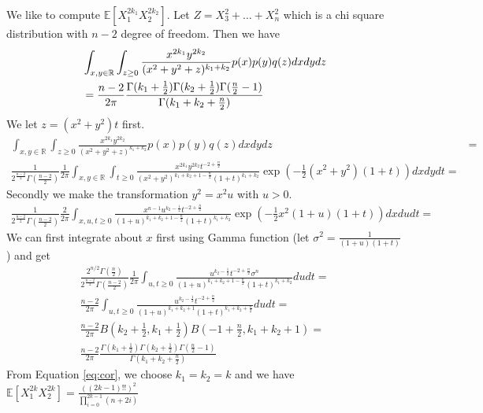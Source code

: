 \documentclass{article}
\def\E{\mathbb{E}}
\begin{document}
We like to compute $\E[X_1^{2k_1} X_2^{2k_2}]$.
Let $ Z = X_3^2 + \dots + X_n^2$ which is a chi square distribution
with $n-2$ degree of freedom.
Then we have
\begin{align}\label{eq:cor}
&\int_{x,y\in \mathbb{R}}\int_{z\geq 0}
\frac{x^{2k_1} y^{2k_2}}{(x^2+y^2+z)^{k_1 + k_2}} p(x)p(y)q(z) dxdydz \notag\\
&=\frac{n-2}{2\pi} \frac{\Gamma(k_1 + \frac{1}{2})
\Gamma(k_2 + \frac{1}{2})
\Gamma(\frac{n}{2}-1)}{\Gamma(k_1 + k_2 + \frac{n}{2})}
\end{align}
We let $z=(x^2+y^2)t$ first.
\begin{align*}
\int_{x,y\in \mathbb{R}}\int_{z\geq 0}
\frac{x^{2k_1} y^{2k_2}}{(x^2+y^2+z)^{k_1 + k_2}} p(x)p(y)q(z) dxdydz & =\\
\frac{1}{2^{\frac{n-2}{2}}\Gamma(\frac{n-2}{2})}\frac{1}{2\pi}
\int_{x,y\in \mathbb{R}}\int_{t\geq 0}
\frac{x^{2k_1} y^{2k_2}t^{-2+\frac{n}{2}}}
{(x^2+y^2)^{k_1 + k_2+1-\frac{n}{2}}(1+t)^{k_1 + k_2}}
\exp(-\frac{1}{2}(x^2+y^2)(1+t))dxdydt =
\end{align*}
Secondly we make the transformation $y^2=x^2u$ with $u>0$.
\begin{align*}
\frac{1}{2^{\frac{n-2}{2}}\Gamma(\frac{n-2}{2})}\frac{2}{2\pi}
\int_{x,u,t\geq 0}\frac{x^{n-1}
u^{k_2 - \frac{1}{2}}t^{-2+\frac{n}{2}}}
{(1+u)^{k_1 + k_2+1-\frac{n}{2}}(1+t)^{k_1 + k_2}}
\exp(-\frac{1}{2}x^2(1+u)(1+t))dxdudt =
\end{align*}
We can first integrate about $x$ first using Gamma function
(let $\sigma^2 = \frac{1}{(1+u)(1+t)}$)
and get
\begin{align*}
\frac{2^{n/2} \Gamma(\frac{n}{2})}{2^{\frac{n-2}{2}}
\Gamma(\frac{n-2}{2})}\frac{1}{2\pi}\int_{u,t\geq 0}
\frac{u^{k_2 - \frac{1}{2}}t^{-2+\frac{n}{2}}\sigma^n}
{(1+u)^{k_1 + k_2+1-\frac{n}{2}}(1+t)^{k_1 + k_2}}dudt = \\
\frac{n-2}{2\pi}\int_{u,t\geq 0}
\frac{u^{k_2 - \frac{1}{2}}t^{-2+\frac{n}{2}}}
{(1+u)^{k_1 + k_2+1}(1+t)^{k_1 + k_2 + \frac{n}{2}}}dudt = \\
\frac{n-2}{2\pi}
B(k_2 + \frac{1}{2}, k_1 + \frac{1}{2}) B(-1+\frac{n}{2}, k_1 + k_2 + 1) =\\
\frac{n-2}{2\pi} \frac{\Gamma(k_1 + \frac{1}{2})
\Gamma(k_2 + \frac{1}{2})\Gamma(\frac{n}{2}-1)}
{\Gamma(k_1 + k_2 + \frac{n}{2})}
\end{align*}
From Equation \eqref{eq:cor}, we choose $k_1 = k_2 = k$ and we have
$\E[X_1^{2k}X_2^{2k}]=\frac{((2k-1)!!)^2}{\prod_{i=0}^{2k-1} (n + 2i)}$
\end{document}

